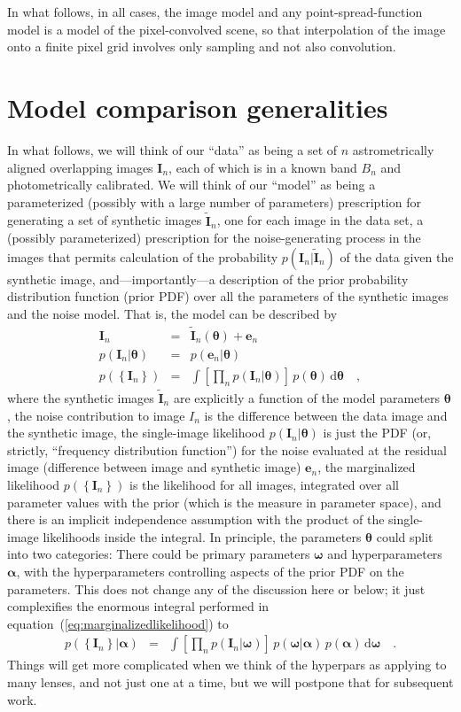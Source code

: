 \documentclass[12pt]{article}
\newcommand{\equationname}{equation}
\renewcommand{\vector}[1]{\boldsymbol{#1}}
\newcommand{\allimages}{\left\{\image_n\right\}}
\newcommand{\allpars}{\vector{\theta}}
\newcommand{\band}{B}
\newcommand{\dd}{\mathrm{d}}
\newcommand{\hyperpars}{\vector{\alpha}}
\newcommand{\image}{\vector{I}}
\newcommand{\pars}{\vector{\omega}}
\newcommand{\residual}{\vector{e}}
\newcommand{\synthetic}{\vector{\tilde{I}}}
\begin{document}
In what follows, in all cases, the image model and any
point-spread-function model is a model of the pixel-convolved scene,
so that interpolation of the image onto a finite pixel grid involves
only sampling and not also convolution.

\section{Model comparison generalities}

In what follows, we will think of our ``data'' as being a set of $n$
astrometrically aligned overlapping images $\image_n$, each of which
is in a known band $\band_n$ and photometrically calibrated.  We will
think of our ``model'' as being a parameterized (possibly with a large
number of parameters) prescription for generating a set of synthetic
images $\synthetic_n$, one for each image in the data set, a (possibly
parameterized) prescription for the noise-generating process in the
images that permits calculation of the probability
$p(\image_n|\synthetic_n)$ of the data given the synthetic image,
and---importantly---a description of the prior probability
distribution function (prior PDF) over all the parameters of the
synthetic images and the noise model.  That is, the model can be
described by
\begin{eqnarray}\displaystyle
\image_n &=& \synthetic_n(\allpars) + \residual_n
\\
p(\image_n|\allpars) &=& p(\residual_n|\allpars)
\\
p(\allimages) &=& \int \left[\prod_n p(\image_n|\allpars)\right]\,p(\allpars)\,\dd\allpars
\label{eq:marginalizedlikelihood}\quad,
\end{eqnarray}
where the synthetic images $\synthetic_n$ are explicitly a function of
the model parameters $\allpars$, the noise contribution to image $I_n$
is the difference between the data image and the synthetic image, the
single-image likelihood $p(\image_n|\allpars)$ is just the PDF (or,
strictly, ``frequency distribution function'') for the noise evaluated
at the residual image (difference between image and synthetic image)
$\residual_n$, the marginalized likelihood $p(\allimages)$ is the
likelihood for all images, integrated over all parameter values with
the prior (which is the measure in parameter space), and there is an
implicit independence assumption with the product of the single-image
likelihoods inside the integral.  In principle, the parameters
$\allpars$ could split into two categories: There could be primary
parameters $\pars$ and hyperparameters $\hyperpars$, with the
hyperparameters controlling aspects of the prior PDF on the
parameters.  This does not change any of the discussion here or below;
it just complexifies the enormous integral performed in
\equationname~(\ref{eq:marginalizedlikelihood}) to
\begin{eqnarray}\displaystyle
p(\allimages|\hyperpars) &=& \int \left[\prod_n p(\image_n|\pars)\right]\,p(\pars|\hyperpars)\,p(\hyperpars)\,\dd\pars
\quad .
\end{eqnarray}
Things will get more complicated when we think of the hyperpars as
applying to many lenses, and not just one at a time, but we will
postpone that for subsequent work.
\end{document}
